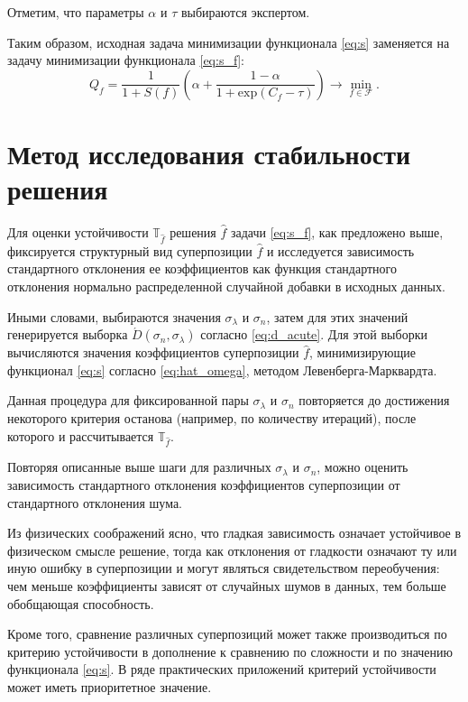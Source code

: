 \documentclass[11pt,a4paper]{article}
\theoremstyle{definition}
\begin{document}
Отметим, что параметры $\alpha$ и $\tau$ выбираются экспертом.

Таким образом, исходная задача минимизации функционала \eqref{eq:s} заменяется
на задачу минимизации функционала \eqref{eq:s_f}:
\begin{equation}
  Q_f = \frac{1}{1 + S(f)} \left(\alpha + \frac{1 - \alpha}{1 + \text{exp} (C_f - \tau)}\right) \rightarrow \min_{f \in \mathcal{F}}.
  \label{eq:s_f_min}
\end{equation}

\section{Метод исследования стабильности решения}

Для оценки устойчивости $\mathbb{T}_{\hat{f}}$ решения $\hat{f}$ задачи
\eqref{eq:s_f}, как предложено выше, фиксируется структурный вид суперпозиции
$\hat{f}$ и исследуется зависимость стандартного отклонения ее коэффициентов
как функция стандартного отклонения нормально распределенной случайной добавки
в исходных данных.

Иными словами, выбираются значения $\sigma_{\lambda}$ и $\sigma_n$, затем для этих
значений генерируется выборка $\acute{D}(\sigma_n, \sigma_{\lambda})$ согласно
\eqref{eq:d_acute}. Для этой выборки вычисляются значения коэффициентов суперпозиции
$\hat{f}$, минимизирующие функционал \eqref{eq:s} согласно \eqref{eq:hat_omega},
методом Левенберга-Марквардта.

Данная процедура для фиксированной пары $\sigma_{\lambda}$ и $\sigma_n$ повторяется
до достижения некоторого критерия останова (например, по количеству итераций),
после которого и рассчитывается $\mathbb{T}_{\hat{f}}$.

Повторяя описанные выше шаги для различных $\sigma_{\lambda}$ и $\sigma_n$, можно
оценить зависимость стандартного отклонения коэффициентов суперпозиции от
стандартного отклонения шума.

Из физических соображений ясно, что гладкая зависимость означает устойчивое в
физическом смысле решение, тогда как отклонения от гладкости означают
ту или иную ошибку в суперпозиции и могут являться свидетельством переобучения:
чем меньше коэффициенты зависят от случайных шумов в данных, тем больше обобщающая
способность.

Кроме того, сравнение различных суперпозиций может также производиться по
критерию устойчивости в дополнение к сравнению по сложности и по значению
функционала \eqref{eq:s}. В ряде практических приложений критерий устойчивости
может иметь приоритетное значение.
\end{document}
